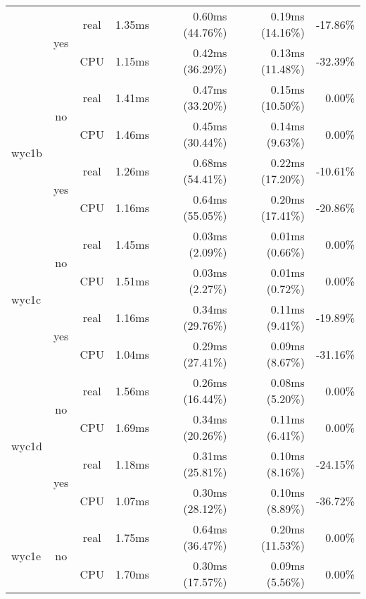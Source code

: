 \documentclass[en]{pracamgr}
\begin{document}
\begin{appendices}
\begin{small}
\begin{longtable}{|l|c|c|r|r|r|r|}
                          \cline{2-7}
                          & \multirow{2}{*}{yes} & real & 1.35ms & 0.60ms (44.76\%) & 0.19ms (14.16\%) & -17.86\% \\*
                          &                      & CPU  & 1.15ms & 0.42ms (36.29\%) & 0.13ms (11.48\%) & -32.39\% \\
\hline
\multirow{4}{*}{wyc1b}    & \multirow{2}{*}{no}  & real & 1.41ms & 0.47ms (33.20\%) & 0.15ms (10.50\%) & 0.00\% \\*
                          &                      & CPU  & 1.46ms & 0.45ms (30.44\%) & 0.14ms (9.63\%) & 0.00\% \\*
                          \cline{2-7}
                          & \multirow{2}{*}{yes} & real & 1.26ms & 0.68ms (54.41\%) & 0.22ms (17.20\%) & -10.61\% \\*
                          &                      & CPU  & 1.16ms & 0.64ms (55.05\%) & 0.20ms (17.41\%) & -20.86\% \\
\hline
\multirow{4}{*}{wyc1c}    & \multirow{2}{*}{no}  & real & 1.45ms & 0.03ms (2.09\%) & 0.01ms (0.66\%) & 0.00\% \\*
                          &                      & CPU  & 1.51ms & 0.03ms (2.27\%) & 0.01ms (0.72\%) & 0.00\% \\*
                          \cline{2-7}
                          & \multirow{2}{*}{yes} & real & 1.16ms & 0.34ms (29.76\%) & 0.11ms (9.41\%) & -19.89\% \\*
                          &                      & CPU  & 1.04ms & 0.29ms (27.41\%) & 0.09ms (8.67\%) & -31.16\% \\
\hline
\multirow{4}{*}{wyc1d}    & \multirow{2}{*}{no}  & real & 1.56ms & 0.26ms (16.44\%) & 0.08ms (5.20\%) & 0.00\% \\*
                          &                      & CPU  & 1.69ms & 0.34ms (20.26\%) & 0.11ms (6.41\%) & 0.00\% \\*
                          \cline{2-7}
                          & \multirow{2}{*}{yes} & real & 1.18ms & 0.31ms (25.81\%) & 0.10ms (8.16\%) & -24.15\% \\*
                          &                      & CPU  & 1.07ms & 0.30ms (28.12\%) & 0.10ms (8.89\%) & -36.72\% \\
\hline
\multirow{4}{*}{wyc1e}    & \multirow{2}{*}{no}  & real & 1.75ms & 0.64ms (36.47\%) & 0.20ms (11.53\%) & 0.00\% \\*
                          &                      & CPU  & 1.70ms & 0.30ms (17.57\%) & 0.09ms (5.56\%) & 0.00\% \\*

\end{longtable}
\end{small}
\end{appendices}
\end{document}
